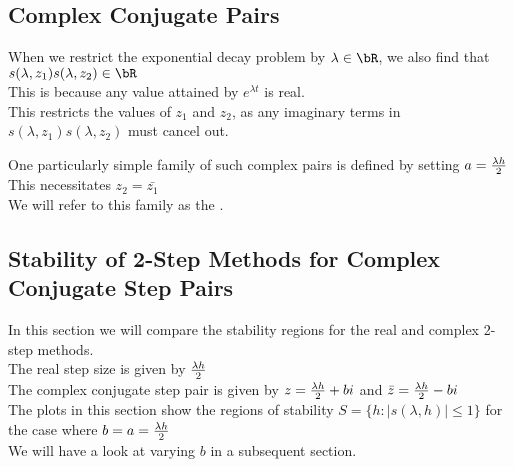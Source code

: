\subsection{Complex Conjugate Pairs}
\begin{multicols}{2}
\columnbreak{}
\par When we restrict the exponential decay problem by $\lambda \in \bR$, we also find that $s(\lambda, z_1) s(\lambda, z_2) \in \bR$\\
This is because any value attained by $e^{\lambda t}$ is real.\\
This restricts the values of $z_1$ and $z_2$, as any imaginary terms in $s(\lambda, z_1) s(\lambda, z_2)$ must cancel out.\\

\par One particularly simple family of such complex pairs is defined by setting $a = \frac{\lambda h}{2}$\\
This necessitates $z_2 = \bar{z_1}$\\
We will refer to this family as the .\\
\end{multicols}

\newpage
\subsection{Stability of 2-Step Methods for Complex Conjugate Step Pairs}
\par In this section we will compare the stability regions for the real and complex 2-step methods.\\
The real step size is given by $\frac{\lambda h}{2}$\\
The complex conjugate step pair is given by $z = \frac{\lambda h}{2} + bi$ and $\bar{z} = \frac{\lambda h}{2} - bi$\\
The plots in this section show the regions of stability $S = \{h : |s(\lambda, h)| \leq 1\}$ for the case where $b=a=\frac{\lambda h}{2}$\\
We will have a look at varying $b$ in a subsequent section.\\


